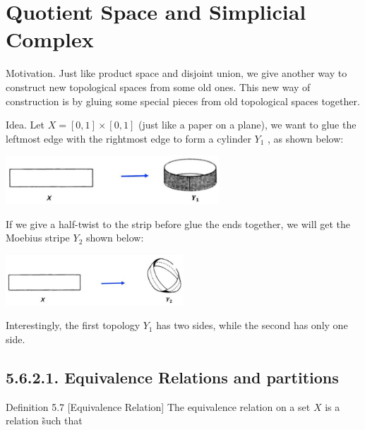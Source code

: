 


\chapter{Quotient Space and Simplicial Complex}

Motivation. Just like product space and disjoint union, we give another way to construct new topological spaces from some old ones. This new way of construction is by gluing some special pieces from old topological spaces together.

Idea. Let \(X = \left\lbrack  {0,1}\right\rbrack   \times  \left\lbrack  {0,1}\right\rbrack\) (just like a paper on a plane), we want to glue the leftmost edge with the rightmost edge to form a cylinder \({Y}_{1}\) , as shown below:

\begin{center}
\includegraphics[max width=0.6\textwidth]{images/bo_d2bcsrref24c73avs720_60_452_764_734_167_0.jpg}
\end{center}
\hspace*{3em} 

If we give a half-twist to the strip before glue the ends together, we will get the Moebius stripe \({Y}_{2}\) shown below:

\begin{center}
\includegraphics[max width=0.5\textwidth]{images/bo_d2bcsrref24c73avs720_60_448_1175_687_196_0.jpg}
\end{center}
\hspace*{3em} 

Interestingly, the first topology \({Y}_{1}\) has two sides, while the second has only one side.

\section*{5.6.2.1. Equivalence Relations and partitions}

Definition 5.7 [Equivalence Relation] The equivalence relation on a set \(X\) is a relation \~ such that

